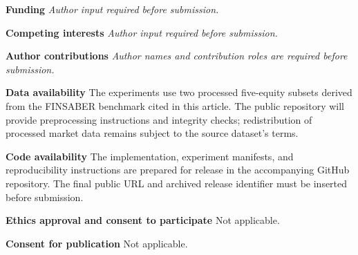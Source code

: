\documentclass[pdflatex,sn-basic,Numbered]{sn-jnl}
\begin{document}
\textbf{Funding} \emph{Author input required before submission.}

\textbf{Competing interests} \emph{Author input required before submission.}

\textbf{Author contributions} \emph{Author names and contribution roles are required before submission.}

\textbf{Data availability} The experiments use two processed five-equity subsets derived from the FINSABER benchmark cited in this article. The public repository will provide preprocessing instructions and integrity checks; redistribution of processed market data remains subject to the source dataset's terms.

\textbf{Code availability} The implementation, experiment manifests, and reproducibility instructions are prepared for release in the accompanying GitHub repository. The final public URL and archived release identifier must be inserted before submission.

\textbf{Ethics approval and consent to participate} Not applicable.

\textbf{Consent for publication} Not applicable.


\end{document}
